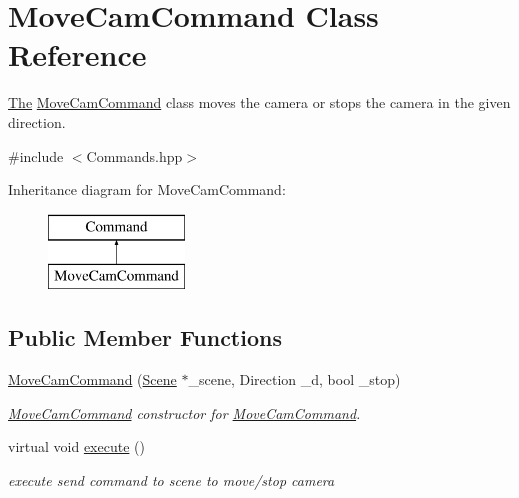 \hypertarget{class_move_cam_command}{}\section{Move\+Cam\+Command Class Reference}
\label{class_move_cam_command}


\hyperlink{namespace_the}{The} \hyperlink{class_move_cam_command}{Move\+Cam\+Command} class moves the camera or stops the camera in the given direction.  




{\ttfamily \#include $<$Commands.\+hpp$>$}

Inheritance diagram for Move\+Cam\+Command\+:\begin{figure}[H]
\begin{center}
\leavevmode
\includegraphics[height=2.000000cm]{class_move_cam_command}
\end{center}
\end{figure}
\subsection*{Public Member Functions}
\begin{DoxyCompactItemize}
\item 
\hyperlink{class_move_cam_command_aa91b99a53c9ad4b87c0809ff556a82f5}{Move\+Cam\+Command} (\hyperlink{class_scene}{Scene} $\ast$\+\_\+scene, Direction \+\_\+d, bool \+\_\+stop)
\begin{DoxyCompactList}\small\item\em \hyperlink{class_move_cam_command}{Move\+Cam\+Command} constructor for \hyperlink{class_move_cam_command}{Move\+Cam\+Command}. \end{DoxyCompactList}\item 
\hypertarget{class_move_cam_command_a23ae44e9c0a4557048d9ec15f51c8eea}{}virtual void \hyperlink{class_move_cam_command_a23ae44e9c0a4557048d9ec15f51c8eea}{execute} ()\label{class_move_cam_command_a23ae44e9c0a4557048d9ec15f51c8eea}

\begin{DoxyCompactList}\small\item\em execute send command to scene to move/stop camera \end{DoxyCompactList}\end{DoxyCompactItemize}


